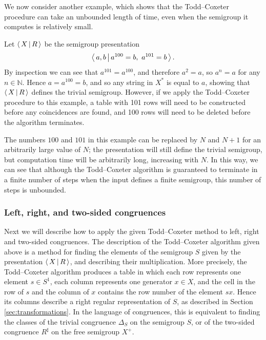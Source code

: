We now consider another example, which shows that the Todd--Coxeter procedure can
take an unbounded length of time, even when the semigroup it computes is
relatively small.

\begin{example}
  \label{ex:tc-long}
  Let $\left\langle \, X \, \middle| \, R \, \right\rangle$ be the semigroup presentation
  $$\left\langle \, a,b \, \middle| \, a^{100}=b,\ a^{101}=b \, \right\rangle.$$
  By inspection we can see that $a^{101}=a^{100}$, and therefore $a^2=a$, so
  $a^n = a$ for any $n \in \mathbb{N}$.  Hence $a=a^{100}=b$, and so any string
  in $X^*$ is equal to $a$, showing that $\left\langle \, X \, \middle| \, R \, \right\rangle$ defines the trivial
  semigroup.  However, if we apply the Todd--Coxeter procedure to this example,
  a table with 101 rows will need to be constructed before any coincidences are
  found, and 100 rows will need to be deleted before the algorithm terminates.

  The numbers $100$ and $101$ in this example can be replaced by $N$ and $N+1$
  for an arbitrarily large value of $N$; the presentation will still define the
  trivial semigroup, but computation time will be arbitrarily long, increasing
  with $N$.  In this way, we can see that although the Todd--Coxeter algorithm is guaranteed
  to terminate in a finite number of steps when the input defines a finite
  semigroup, this number of steps is unbounded.
\end{example}

\subsubsection{Left, right, and two-sided congruences}
\label{sec:tc-l-r}
Next we will describe how to apply the given Todd--Coxeter method to
left, right and two-sided congruences.  The description of the Todd--Coxeter algorithm given
above is a method for finding the elements of the semigroup $S$ given by the
presentation $\left\langle \, X \, \middle| \, R \, \right\rangle$, and describing their multiplication.  More precisely,
the Todd--Coxeter algorithm produces a table in which each row represents one element
$s \in S^1$, each column represents one generator $x \in X$, and the cell in the
row of $s$ and the column of $x$ contains the row number of the element $sx$.
Hence its columns describe a right regular representation of $S$, as described
in Section \ref{sec:transformations}.  In the language of congruences, this is
equivalent to finding the classes of the trivial congruence $\Delta_S$ on the
semigroup $S$, or of the two-sided congruence $R^\sharp$ on the free semigroup
$X^+$.

